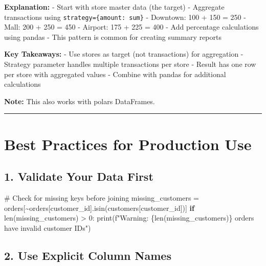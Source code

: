 \documentclass[
  letterpaper,
]{scrbook}
\newenvironment{Shaded}{\begin{snugshade}}{\end{snugshade}}
\newcommand{\BuiltInTok}[1]{\textcolor[rgb]{0.00,0.23,0.31}{#1}}
\newcommand{\CommentTok}[1]{\textcolor[rgb]{0.37,0.37,0.37}{#1}}
\newcommand{\ControlFlowTok}[1]{\textcolor[rgb]{0.00,0.23,0.31}{\textbf{#1}}}
\newcommand{\DecValTok}[1]{\textcolor[rgb]{0.68,0.00,0.00}{#1}}
\newcommand{\NormalTok}[1]{\textcolor[rgb]{0.00,0.23,0.31}{#1}}
\newcommand{\OperatorTok}[1]{\textcolor[rgb]{0.37,0.37,0.37}{#1}}
\newcommand{\SpecialCharTok}[1]{\textcolor[rgb]{0.37,0.37,0.37}{#1}}
\newcommand{\SpecialStringTok}[1]{\textcolor[rgb]{0.13,0.47,0.30}{#1}}
\newcommand{\StringTok}[1]{\textcolor[rgb]{0.13,0.47,0.30}{#1}}
\begin{document}
\textbf{Explanation:} - Start with store master data (the target) -
Aggregate transactions using
\texttt{strategy=\{\textquotesingle{}amount\textquotesingle{}:\ \textquotesingle{}sum\textquotesingle{}\}}
- Downtown: 100 + 150 = 250 - Mall: 200 + 250 = 450 - Airport: 175 + 225
= 400 - Add percentage calculations using pandas - This pattern is
common for creating summary reports

\textbf{Key Takeaways:} - Use stores as target (not transactions) for
aggregation - Strategy parameter handles multiple transactions per store
- Result has one row per store with aggregated values - Combine with
pandas for additional calculations

\textbf{Note:} This also works with polars DataFrames.

\begin{center}\rule{0.5\linewidth}{0.5pt}\end{center}

\section{Best Practices for Production
Use}\label{best-practices-for-production-use}

\subsection{1. Validate Your Data First}\label{validate-your-data-first}

\begin{Shaded}
\begin{Highlighting}[]
\CommentTok{\# Check for missing keys before joining}
\NormalTok{missing\_customers }\OperatorTok{=}\NormalTok{ orders[}\OperatorTok{\textasciitilde{}}\NormalTok{orders[}\StringTok{\textquotesingle{}customer\_id\textquotesingle{}}\NormalTok{].isin(customers[}\StringTok{\textquotesingle{}customer\_id\textquotesingle{}}\NormalTok{])]}
\ControlFlowTok{if} \BuiltInTok{len}\NormalTok{(missing\_customers) }\OperatorTok{\textgreater{}} \DecValTok{0}\NormalTok{:}
    \BuiltInTok{print}\NormalTok{(}\SpecialStringTok{f"Warning: }\SpecialCharTok{\{}\BuiltInTok{len}\NormalTok{(missing\_customers)}\SpecialCharTok{\}}\SpecialStringTok{ orders have invalid customer IDs"}\NormalTok{)}
\end{Highlighting}
\end{Shaded}

\subsection{2. Use Explicit Column
Names}\label{use-explicit-column-names}
\end{document}
